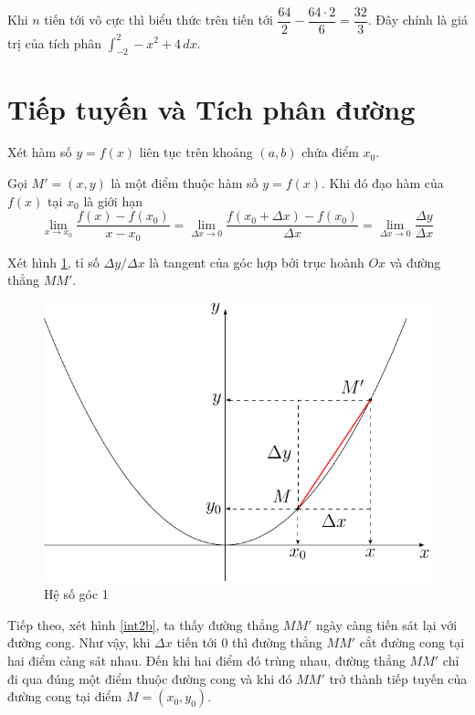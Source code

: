 Khi $n$ tiến tới vô cực thì biểu thức trên tiến tới $\dfrac{64}{2} - \dfrac{64 \cdot 2}{6} = \dfrac{32}{3}$. Đây chính là giá trị của tích phân $\displaystyle{\int_{-2}^2 -x^2 + 4 \, dx}$.

\section{Tiếp tuyến và Tích phân đường}

Xét hàm số $y = f(x)$ liên tục trên khoảng $(a, b)$ chứa điểm $x_0$.

Gọi $M' = (x, y)$ là một điểm thuộc hàm số $y = f(x)$. Khi đó đạo hàm của $f(x)$ tại $x_0$ là giới hạn  \[\lim_{x \to x_0} \frac{f(x) - f(x_0)}{x - x_0} = \lim_{\Delta x \to 0} \frac{f(x_0 + \Delta x) - f(x_0)}{\Delta x} = \lim_{\Delta x \to 0} \frac{\Delta y}{\Delta x}\]

Xét hình \ref{int2a}, tỉ số $\Delta y / \Delta x$ là tangent của góc hợp bởi trục hoành $Ox$ và đường thẳng $MM'$.

\begin{figure}[ht]
	\centering
	\includegraphics[page=1,scale=0.75]{analytic_geometry/int2.pdf}
	\caption{Hệ số góc 1}
	\label{int2a}
\end{figure}

Tiếp theo, xét hình \ref{int2b}, ta thấy đường thẳng $MM'$ ngày càng tiến sát lại với đường cong. Như vậy, khi $\Delta x$ tiến tới 0 thì đường thẳng $MM'$ cắt đường cong tại hai điểm càng sát nhau. Đến khi hai điểm đó trùng nhau, đường thẳng $MM'$ chỉ đi qua đúng một điểm thuộc đường cong và khi đó $MM'$ trở thành tiếp tuyến của đường cong tại điểm $M = (x_0, y_0)$.

